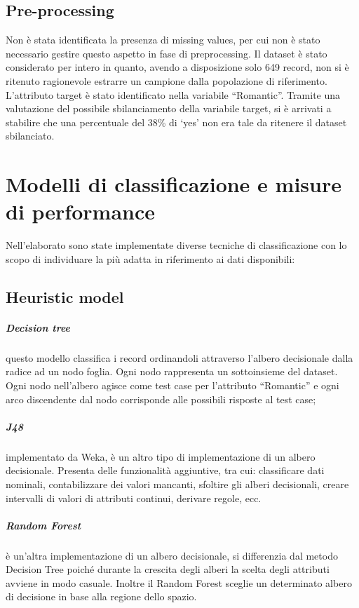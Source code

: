 \documentclass[12pt,a4paper]{report}
\begin{document}
\begin{multicols}{2}
\section{Pre-processing}
Non è stata identificata la presenza di missing values, per cui non è stato necessario gestire questo aspetto in fase di preprocessing. Il dataset è stato considerato per intero in quanto, avendo a disposizione solo 649 record, non si è ritenuto ragionevole estrarre un campione dalla popolazione di riferimento. 
L’attributo target è stato identificato nella variabile “Romantic”. Tramite una valutazione del possibile sbilanciamento della variabile target, si è arrivati a stabilire che una percentuale del 38\% di ‘yes’ non era tale da ritenere il dataset sbilanciato.

	
	\chapter{Modelli di classificazione e misure di performance}
	
	Nell’elaborato sono state implementate diverse tecniche di classificazione con lo scopo di individuare la più adatta in riferimento ai dati disponibili: 
	
	\section{Heuristic model}
	
	\paragraph{Decision tree} questo modello classifica i record ordinandoli attraverso l'albero decisionale dalla radice ad un nodo foglia. Ogni nodo rappresenta un sottoinsieme del dataset. Ogni nodo nell'albero agisce come test case per l'attributo “Romantic” e ogni arco discendente dal nodo corrisponde alle possibili risposte al test case;
	\paragraph{J48} implementato da Weka, è un altro tipo di implementazione di un albero decisionale. 
			Presenta delle funzionalità aggiuntive, tra cui: classificare dati nominali, contabilizzare dei valori mancanti, sfoltire gli alberi decisionali, creare intervalli di valori di attributi continui, derivare regole, ecc.
			\paragraph{Random Forest} è un'altra implementazione di un albero decisionale, si differenzia dal metodo Decision Tree poiché  durante la crescita degli alberi la scelta degli attributi avviene in modo casuale. Inoltre il Random Forest sceglie un determinato albero di decisione in base alla regione dello spazio. 
			

\end{multicols}
\end{document}
